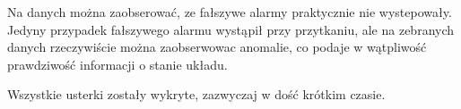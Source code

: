 \documentclass[a4paper,12pt]{article}
\begin{document}
Na danych można zaobserować, ze fałszywe alarmy praktycznie nie wystepowały. Jedyny przypadek fałszywego alarmu wystąpił przy przytkaniu, ale na zebranych danych rzeczywiście można zaobserwowac anomalie, co podaje w wątpliwość prawdziwość informacji o stanie układu.

Wszystkie usterki zostały wykryte, zazwyczaj w dość krótkim czasie.













\end{document}
